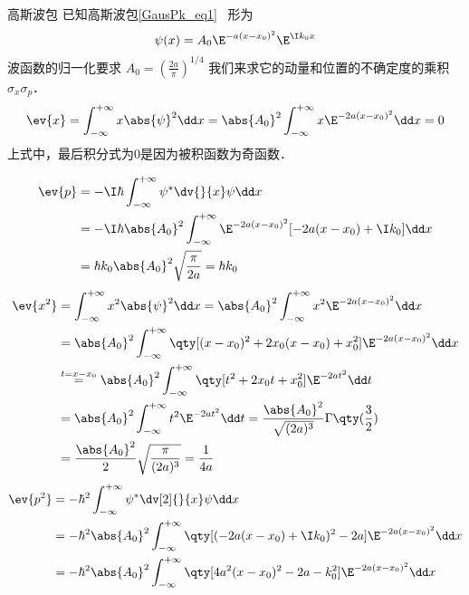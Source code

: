 \begin{example}{高斯波包}\label{Uncert_ex1}
已知高斯波包\autoref{GausPk_eq1}~ 形为
\begin{equation}
\psi(x)=A_0\E^{-a(x-x_0)^2}\E^{\I k_0x}
\end{equation}
波函数的归一化要求 $A_0=(\frac{2a}{\pi})^{1/4}$
我们来求它的动量和位置的不确定度的乘积 $\sigma_x\sigma_p$．
\begin{equation}
\ev{x}=\int_{-\infty}^{+\infty}x\abs{\psi}^2\dd x=\abs{A_0}^2\int_{-\infty}^{+\infty}x\E^{-2a(x-x_0)^2}\dd x=0
\end{equation}
上式中，最后积分式为0是因为被积函数为奇函数．

\begin{equation}
\begin{aligned}
\ev{p}&=-\I\hbar\int_{-\infty}^{+\infty}\psi^{*}\dv{}{x}\psi\dd x\\
&=-\I\hbar\abs{A_0}^2\int_{-\infty}^{+\infty}\E^{-2a(x-x_0)^2}[-2a(x-x_0)+\I k_0]\dd x\\
&=\hbar k_0\abs{A_0}^2\sqrt{\frac{\pi}{2a}}=\hbar k_0
\end{aligned}
\end{equation}
\begin{equation}
\begin{aligned}
\ev{x^2}&=\int_{-\infty}^{+\infty}x^2\abs{\psi}^2\dd x=\abs{A_0}^2\int_{-\infty}^{+\infty}x^2\E^{-2a(x-x_0)^2}\dd x\\
&=\abs{A_0}^2\int_{-\infty}^{+\infty}\qty[(x-x_0)^2+2x_0(x-x_0)+x_0^2]\E^{-2a(x-x_0)^2}\dd x\\
&\overset{t=x-x_0}{=}\abs{A_0}^2\int_{-\infty}^{+\infty}\qty[t^2+2x_0t+x_0^2]\E^{-2at^2}\dd t\\
&=\abs{A_0}^2\int_{-\infty}^{+\infty}t^2\E^{-2at^2}\dd t
=\frac{\abs{A_0}^2}{\sqrt{(2a)^3}}\Gamma\qty(\frac{3}{2})\\
&=\frac{\abs{A_0}^2}{2}\sqrt{\frac{\pi}{(2a)^3}}=\frac{1}{4a}
\end{aligned}
\end{equation}
\begin{equation}
\begin{aligned}
\ev{p^2}&=-\hbar^2 \int_{-\infty}^{+\infty}\psi^{*}\dv[2]{}{x}\psi\dd x\\
&=-\hbar^2\abs{A_0}^2\int_{-\infty}^{+\infty}\qty[(-2a(x-x_0)+\I k_0)^2-2a]\E^{-2a(x-x_0)^2}\dd x\\
&=-\hbar^2\abs{A_0}^2\int_{-\infty}^{+\infty}\qty[4a^2(x-x_0)^2-2a-k_0^2]\E^{-2a(x-x_0)^2}\dd x\\

\end{aligned}
\end{equation}
\end{example}
